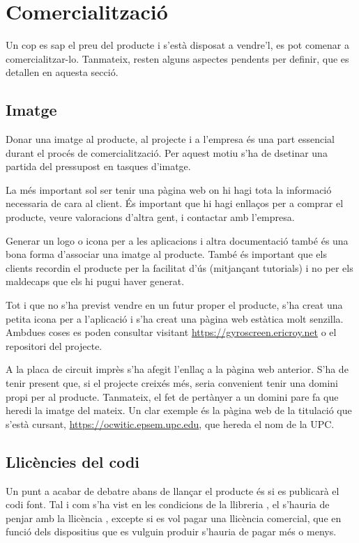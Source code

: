 \section{Comercialització}

Un cop es sap el preu del producte i s'està disposat a vendre'l, es pot
comenar a comercialitzar-lo. Tanmateix, resten alguns aspectes pendents per
definir, que es detallen en aquesta secció.

\subsection{Imatge}

Donar una imatge al producte, al projecte i a l'empresa és una part essencial
durant el procés de comercialització. Per aquest motiu s'ha de dsetinar una
partida del pressupost en tasques d'imatge.

La més important sol ser tenir una pàgina web on hi hagi tota la informació
necessaria de cara al client. És important que hi hagi enllaços per a comprar el
producte, veure valoracions d'altra gent, i contactar amb l'empresa.

Generar un logo o icona per a les aplicacions i altra documentació també és una
bona forma d'associar una imatge al producte. També és important que els clients
recordin el producte per la facilitat d'ús (mitjançant tutorials) i no per
els maldecaps que els hi pugui haver generat.

Tot i que no s'ha previst vendre en un futur proper el producte, s'ha creat una
petita icona per a l'aplicació i s'ha creat una pàgina web estàtica molt
senzilla. Ambdues coses es poden consultar visitant
\url{https://gyroscreen.ericroy.net} o el repositori del projecte.

A la placa de circuit imprès s'ha afegit l'enllaç a la pàgina web anterior.
S'ha de tenir present que, si el projecte creixés més, seria convenient tenir
una domini propi per al producte. Tanmateix, el fet de pertànyer a un domini
pare fa que heredi la imatge del mateix. Un clar exemple és la pàgina web de
la titulació que s'està cursant, \url{https://ocwitic.epsem.upc.edu}, que
hereda el nom de la UPC.

\subsection{Llicències del codi}

Un punt a acabar de debatre abans de llançar el producte és si es publicarà el
codi font. Tal i com s'ha vist en les condicions de la llibreria , el
 s'hauria de penjar amb la llicència , excepte si es
vol pagar una llicència comercial, que en funció dels dispositius que es vulguin
produir s'hauria de pagar més o menys.

